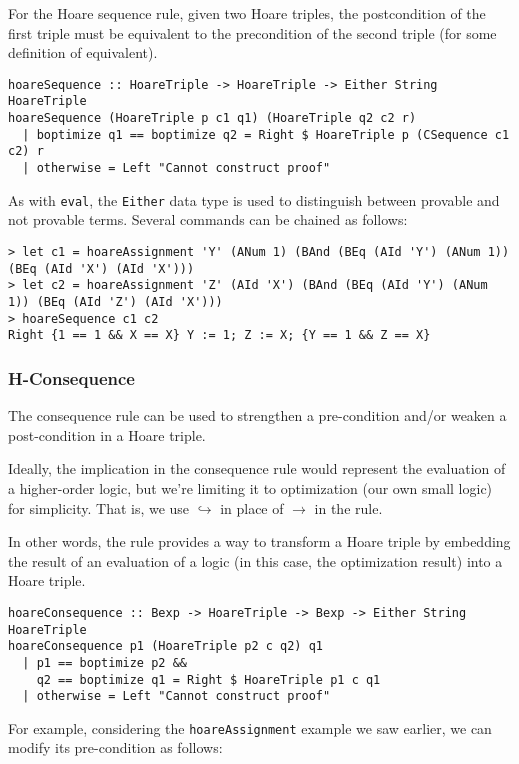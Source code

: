\documentclass{article}
\begin{document}
For the Hoare sequence rule, given two Hoare triples, the postcondition of the first triple must be equivalent to the precondition of the second triple (for some definition of equivalent).

\begin{lstlisting}
hoareSequence :: HoareTriple -> HoareTriple -> Either String HoareTriple
hoareSequence (HoareTriple p c1 q1) (HoareTriple q2 c2 r)
  | boptimize q1 == boptimize q2 = Right $ HoareTriple p (CSequence c1 c2) r
  | otherwise = Left "Cannot construct proof"
\end{lstlisting}

As with \texttt{eval}, the \texttt{Either} data type is used to distinguish between provable and not provable terms. Several commands can be chained as follows:

\begin{lstlisting}
> let c1 = hoareAssignment 'Y' (ANum 1) (BAnd (BEq (AId 'Y') (ANum 1)) (BEq (AId 'X') (AId 'X')))
> let c2 = hoareAssignment 'Z' (AId 'X') (BAnd (BEq (AId 'Y') (ANum 1)) (BEq (AId 'Z') (AId 'X')))
> hoareSequence c1 c2
Right {1 == 1 && X == X} Y := 1; Z := X; {Y == 1 && Z == X}
\end{lstlisting}

\subsubsection{H-Consequence}

The consequence rule can be used to strengthen a pre-condition and/or weaken a post-condition in a Hoare triple.

Ideally, the implication in the consequence rule would represent the evaluation of a higher-order logic, but we're limiting it to optimization (our own small logic) for simplicity. That is, we use $\hookrightarrow$ in place of $\to$ in the rule.

In other words, the rule provides a way to transform a Hoare triple by embedding the result of an evaluation of a logic (in this case, the optimization result) into a Hoare triple.

\begin{lstlisting}
hoareConsequence :: Bexp -> HoareTriple -> Bexp -> Either String HoareTriple
hoareConsequence p1 (HoareTriple p2 c q2) q1
  | p1 == boptimize p2 &&
    q2 == boptimize q1 = Right $ HoareTriple p1 c q1
  | otherwise = Left "Cannot construct proof"
\end{lstlisting}

For example, considering the \texttt{hoareAssignment} example we saw earlier, we can modify its pre-condition as follows:
\end{document}
